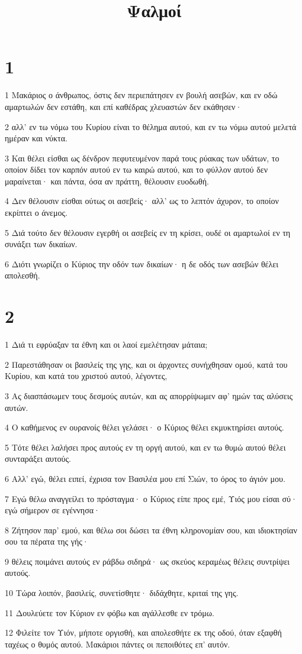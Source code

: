 

\title{Ψαλμοί}


\chapter{1}

\par 1 Μακάριος ο άνθρωπος, όστις δεν περιεπάτησεν εν βουλή ασεβών, και εν οδώ αμαρτωλών δεν εστάθη, και επί καθέδρας χλευαστών δεν εκάθησεν·
\par 2 αλλ' εν τω νόμω του Κυρίου είναι το θέλημα αυτού, και εν τω νόμω αυτού μελετά ημέραν και νύκτα.
\par 3 Και θέλει είσθαι ως δένδρον πεφυτευμένον παρά τους ρύακας των υδάτων, το οποίον δίδει τον καρπόν αυτού εν τω καιρώ αυτού, και το φύλλον αυτού δεν μαραίνεται· και πάντα, όσα αν πράττη, θέλουσιν ευοδωθή.
\par 4 Δεν θέλουσιν είσθαι ούτως οι ασεβείς· αλλ' ως το λεπτόν άχυρον, το οποίον εκρίπτει ο άνεμος.
\par 5 Διά τούτο δεν θέλουσιν εγερθή οι ασεβείς εν τη κρίσει, ουδέ οι αμαρτωλοί εν τη συνάξει των δικαίων.
\par 6 Διότι γνωρίζει ο Κύριος την οδόν των δικαίων· η δε οδός των ασεβών θέλει απολεσθή.

\chapter{2}

\par 1 Διά τι εφρύαξαν τα έθνη και οι λαοί εμελέτησαν μάταια;
\par 2 Παρεστάθησαν οι βασιλείς της γης, και οι άρχοντες συνήχθησαν ομού, κατά του Κυρίου, και κατά του χριστού αυτού, λέγοντες,
\par 3 Ας διασπάσωμεν τους δεσμούς αυτών, και ας απορρίψωμεν αφ' ημών τας αλύσεις αυτών.
\par 4 Ο καθήμενος εν ουρανοίς θέλει γελάσει· ο Κύριος θέλει εκμυκτηρίσει αυτούς.
\par 5 Τότε θέλει λαλήσει προς αυτούς εν τη οργή αυτού, και εν τω θυμώ αυτού θέλει συνταράξει αυτούς.
\par 6 Αλλ' εγώ, θέλει ειπεί, έχρισα τον Βασιλέα μου επί Σιών, το όρος το άγιόν μου.
\par 7 Εγώ θέλω αναγγείλει το πρόσταγμα· ο Κύριος είπε προς εμέ, Υιός μου είσαι σύ· εγώ σήμερον σε εγέννησα·
\par 8 Ζήτησον παρ' εμού, και θέλω σοι δώσει τα έθνη κληρονομίαν σου, και ιδιοκτησίαν σου τα πέρατα της γής·
\par 9 θέλεις ποιμάνει αυτούς εν ράβδω σιδηρά· ως σκεύος κεραμέως θέλεις συντρίψει αυτούς.
\par 10 Τώρα λοιπόν, βασιλείς, συνετίσθητε· διδάχθητε, κριταί της γης.
\par 11 Δουλεύετε τον Κύριον εν φόβω και αγάλλεσθε εν τρόμω.
\par 12 Φιλείτε τον Υιόν, μήποτε οργισθή, και απολεσθήτε εκ της οδού, όταν εξαφθή ταχέως ο θυμός αυτού. Μακάριοι πάντες οι πεποιθότες επ' αυτόν.

